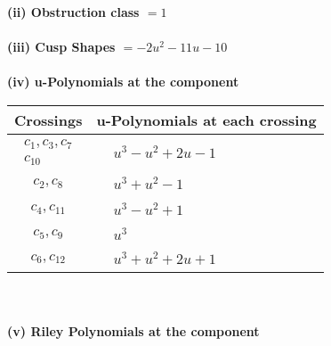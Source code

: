 \documentclass[1p]{elsarticle_modified}
\theoremstyle{definition}
\begin{document}
\flushleft \textbf{(ii) Obstruction class $= 1$}\\~\\
\flushleft \textbf{(iii) Cusp Shapes $= -2 u^2-11 u-10$}\\~\\
\newpage\renewcommand{\arraystretch}{1}
\flushleft \textbf{(iv) u-Polynomials at the component}\newline \\
\begin{tabular}{m{50pt}|m{274pt}}
Crossings & \hspace{64pt}u-Polynomials at each crossing \\
\hline $$\begin{aligned}c_{1},c_{3},c_{7}\\c_{10}\end{aligned}$$&$\begin{aligned}
&u^3- u^2+2 u-1
\end{aligned}$\\
\hline $$\begin{aligned}c_{2},c_{8}\end{aligned}$$&$\begin{aligned}
&u^3+u^2-1
\end{aligned}$\\
\hline $$\begin{aligned}c_{4},c_{11}\end{aligned}$$&$\begin{aligned}
&u^3- u^2+1
\end{aligned}$\\
\hline $$\begin{aligned}c_{5},c_{9}\end{aligned}$$&$\begin{aligned}
&u^3
\end{aligned}$\\
\hline $$\begin{aligned}c_{6},c_{12}\end{aligned}$$&$\begin{aligned}
&u^3+u^2+2 u+1
\end{aligned}$\\
\hline
\end{tabular}\\~\\
\newpage\renewcommand{\arraystretch}{1}
\flushleft \textbf{(v) Riley Polynomials at the component}\newline \\
\end{document}
